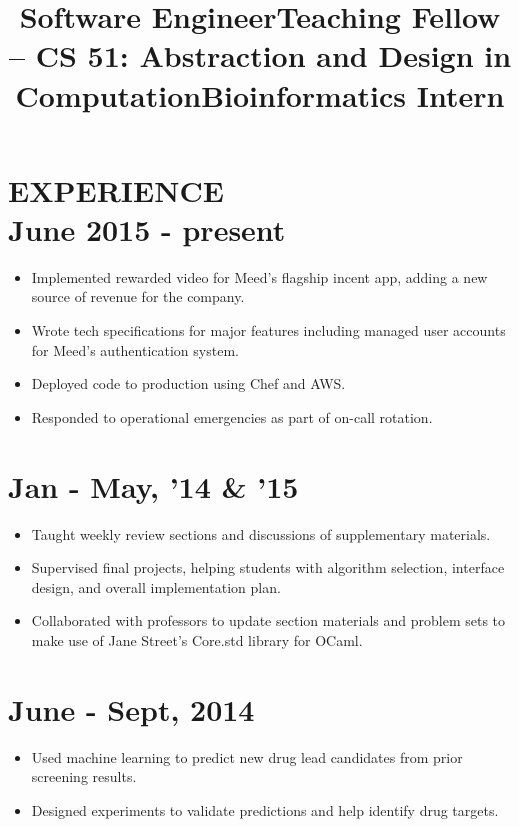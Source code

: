 \documentclass[centered, margin, 10pt]{res} %
\newcommand\mainsectionfont{\normalsize\bf\textup}
\newcommand\subsectionfont{\small\textmd\textup}
\renewcommand\sectionfont{\mainsectionfont} %
\renewcommand\dates{\section} %
\newenvironment{rlist}
    {\begin{minipage}[t]{\linewidth}\begin{itemize}\raggedright}
    {\end{itemize}\end{minipage}}
\newenvironment{positionlist}
    {\begin{position}\begin{rlist}}
    {\end{rlist}\end{position}}
\begin{document}
\begin{resume}

\renewcommand\sectionfont{\subsectionfont} %

\section{{\mainsectionfont EXPERIENCE} \\ June 2015 - present }
\title{Software Engineer}
\begin{positionlist}
  \item Implemented rewarded video for Meed's flagship incent app, adding a new
    source of revenue for the company.
  \item Wrote tech specifications for major features including managed user
    accounts for Meed's authentication system.
  \item Deployed code to production using Chef and AWS.
  \item Responded to operational emergencies as part of on-call rotation.
\end{positionlist}

\title{Teaching Fellow -- CS 51: Abstraction and Design in Computation}
\dates{Jan - May, '14 \& '15}
\begin{positionlist}
  \item Taught weekly review sections and discussions of supplementary
    materials.
  \item Supervised final projects, helping students with algorithm selection,
    interface design, and overall implementation plan.
  \item Collaborated with professors to update section materials and problem
    sets to make use of Jane Street's Core.std library for OCaml.
\end{positionlist}

\title{Bioinformatics Intern}
\dates{June - Sept, 2014}
\begin{positionlist}
  \item Used machine learning to predict new drug lead candidates from prior
    screening results.
  \item Designed experiments to validate predictions and help identify drug
    targets.
\end{positionlist}


\end{resume}
\end{document}
